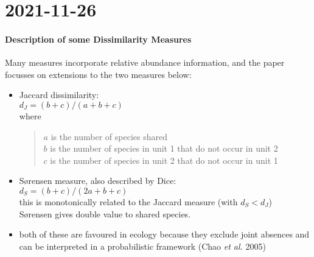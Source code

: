 \documentclass[document.tex]{subfiles}
\begin{document}
\chapter{2021-11-26}

\subsubsection{Description of some Dissimilarity Measures}
Many measures incorporate relative abundance information, and the paper 
focusses on extensions to the two measures below:
\begin{itemize}
    \item Jaccard dissimilarity:
    \\$d_J = (b+c)/(a+b+c)$
    \\where 
    \begin{quote}
        $a$ is the number of species shared
        \\$b$ is the number of species in unit 1 that do not occur in unit 2
        \\$c$ is the number of species in unit 2 that do not occur in unit 1
    \end{quote}
    \item S{\o}rensen measure, also described by Dice:
    \\$d_S = (b+c)/(2a+b+c)$
    \\ this is monotonically related to the Jaccard measure (with $d_S < d_J$)
    \\ S{\o}rensen gives double value to shared species.
    \item both of these are favoured in ecology because they exclude joint 
    absences and can be interpreted in a probabilistic framework 
    (Chao \textit{et al.} 2005)
\end{itemize}
\end{document}
